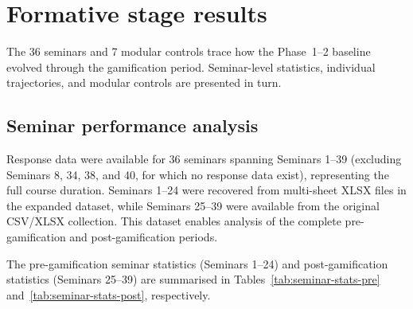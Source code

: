 \section{Formative stage results} \label{sec:formative}

The 36 seminars and 7 modular controls trace how the Phase~1--2 baseline evolved through the gamification period. Seminar-level statistics, individual trajectories, and modular controls are presented in turn.

\subsection{Seminar performance analysis}

Response data were available for 36 seminars spanning Seminars 1--39 (excluding Seminars 8, 34, 38, and 40, for which no response data exist), representing the full course duration. Seminars 1--24 were recovered from multi-sheet XLSX files in the expanded dataset, while Seminars 25--39 were available from the original CSV/XLSX collection. This dataset enables analysis of the complete pre-gamification and post-gamification periods.

The pre-gamification seminar statistics (Seminars 1--24) and post-gamification statistics (Seminars 25--39) are summarised in Tables~\ref{tab:seminar-stats-pre} and~\ref{tab:seminar-stats-post}, respectively.

